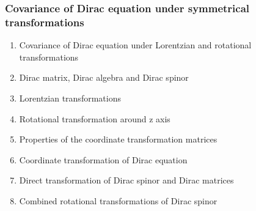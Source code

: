 \documentclass[12pt]{article}
\numberwithin{equation}{section}
\begin{document}
\subsubsection{Covariance of Dirac equation under symmetrical transformations}
\begin{enumerate}
\item Covariance of Dirac equation under Lorentzian and rotational transformations
\item Dirac matrix, Dirac algebra and Dirac spinor
\item Lorentzian transformations
\item Rotational transformation around z axis
\item Properties of the coordinate transformation matrices
\item Coordinate transformation of Dirac equation
\item Direct transformation of Dirac spinor and Dirac matrices
\item Combined rotational transformations of Dirac spinor
\end{enumerate}
\end{document}
